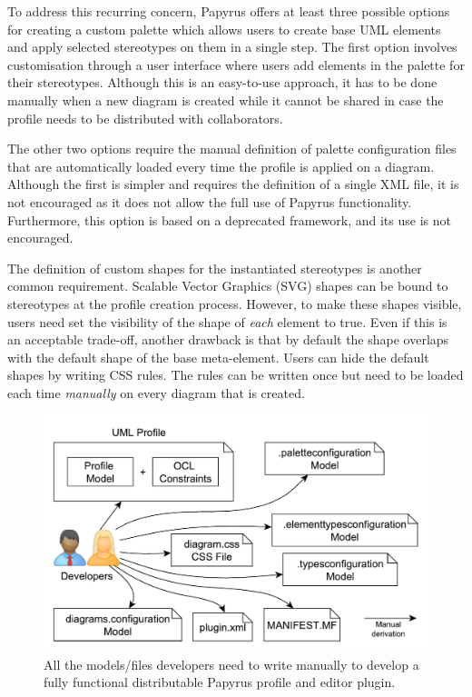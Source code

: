 To address this recurring concern, Papyrus offers at least three possible options for creating a custom palette which allows users to create base UML elements and apply selected stereotypes on them in a single step. 
The first option involves customisation through a user interface where users add elements in the palette for their stereotypes. 
Although this is an easy-to-use approach, it has to be done manually when a new diagram is created while it cannot be shared in case the profile needs to be distributed with collaborators. 

The other two options require the manual definition of palette configuration files that are automatically loaded every time the profile is applied on a diagram. 
Although the first is simpler and requires the definition of a single XML file, it is not encouraged as it does not allow the full use of Papyrus functionality. 
Furthermore, this option is based on a deprecated framework, and its use is not encouraged.


The definition of custom shapes for the instantiated stereotypes is another common requirement. 
Scalable Vector Graphics (SVG) shapes can be bound to stereotypes at the profile creation process. 
However, to make these shapes visible, users need set the visibility of the shape of \textit{each} element to true. 
Even if this is an acceptable trade-off, another drawback is that by default the shape overlaps with the default shape of the base meta-element. 
Users can hide the default shapes by writing CSS rules. 
The rules can be written once but need to be loaded each time \textit{manually} on every diagram that is created. 
\begin{figure}[t]
	\centering
	\includegraphics[width=1\textwidth]{diagrams/neededPapyrusFiles.pdf}
	\vspace{-3mm}
	\caption[]{All the models/files developers need to write manually to 
	develop a fully functional distributable Papyrus profile and editor plugin.}
	\label{fig:neededPapyrusFiles}
	\vspace*{-3mm}
\end{figure}

